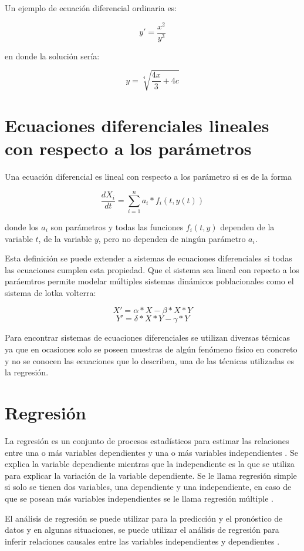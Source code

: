 Un ejemplo de ecuación diferencial ordinaria es:

$$y' = \frac{x^2}{y^3}$$

en donde la solución sería:

$$y = \sqrt[4]{\frac{4x}{3} + 4c}$$


\section{Ecuaciones diferenciales lineales con respecto a los parámetros}

Una ecuación diferencial es lineal con respecto a los parámetro si es de la forma

$$\frac{dX_i}{dt} = \sum_{i=1}^{n} a_i * f_i(t, y(t))$$

donde los $a_i$ son parámetros y todas las funciones $f_i(t,y)$ dependen de la variable $t$, de la variable $y$, pero no dependen de ningún parámetro $a_i$.

Esta definición se puede extender a sistemas de ecuaciones diferenciales si todas las ecuaciones cumplen esta propiedad. Que el sistema sea lineal con repecto a los paráemtros permite modelar múltiples sistemas dinámicos poblacionales como el sistema de lotka volterra:

$$X' = \alpha * X - \beta * X * Y$$
$$Y' = \delta * X * Y - \gamma * Y$$

Para encontrar sistemas de ecuaciones diferenciales se utilizan diversas técnicas ya que en ocasiones solo se poseen muestras de algún fenómeno físico en concreto y no se conocen las ecuaciones que lo describen, una de las técnicas utilizadas es la regresión.

\section{Regresión}\label{section:regression}

La regresión es un conjunto de procesos estadísticos para estimar las relaciones entre una o más variables dependientes y una o más variables independientes \cite{johnson2015applied}. Se explica la variable dependiente mientras que la independiente es la que se utiliza para explicar la variación de la variable dependiente. Se le llama regresión simple si solo se tienen dos variables, una dependiente y una independiente, en caso de que se posean más variables independientes se le llama regresión múltiple \cite{mann2007introductory}.

El análisis de regresión se puede utilizar para la predicción y el pronóstico de datos y en algunas situaciones, se puede utilizar el análisis de regresión para inferir relaciones causales entre las variables independientes y dependientes \cite{mann2007introductory}.

